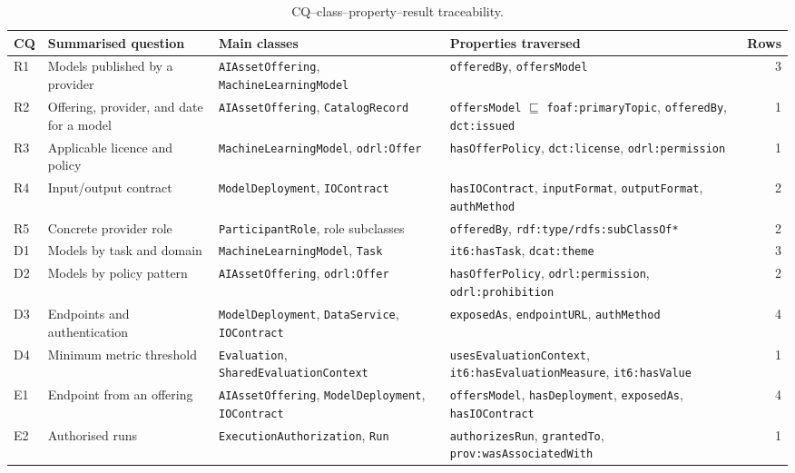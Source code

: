 \documentclass[Afour,sagev,times]{sagej}
\newcommand{\code}[1]{\texttt{#1}}
\begin{document}
\begin{table}[tb]
\scriptsize\sf\centering
\caption{CQ--class--property--result traceability.\label{tab:cq-trace}}
\begin{tabular}{@{}p{0.8cm}p{3.8cm}p{4.0cm}p{4.9cm}r@{}}
\toprule
\textbf{CQ} & \textbf{Summarised question} & \textbf{Main classes} & \textbf{Properties traversed} & \textbf{Rows} \\
\midrule
R1 & Models published by a provider & \code{AIAssetOffering}, \code{MachineLearningModel} & \code{offeredBy}, \code{offersModel} & 3 \\
R2 & Offering, provider, and date for a model & \code{AIAssetOffering}, \code{CatalogRecord} & \code{offersModel} $\sqsubseteq$ \code{foaf:primaryTopic}, \code{offeredBy}, \code{dct:issued} & 1 \\
R3 & Applicable licence and policy & \code{MachineLearningModel}, \code{odrl:Offer} & \code{hasOfferPolicy}, \code{dct:license}, \code{odrl:permission} & 1 \\
R4 & Input/output contract & \code{ModelDeployment}, \code{IOContract} & \code{hasIOContract}, \code{inputFormat}, \code{outputFormat}, \code{authMethod} & 2 \\
R5 & Concrete provider role & \code{ParticipantRole}, role subclasses & \code{offeredBy}, \code{rdf:type/}\newline\code{rdfs:subClassOf*} & 2 \\
D1 & Models by task and domain & \code{MachineLearningModel}, \code{Task} & \code{it6:hasTask}, \code{dcat:theme} & 3 \\
D2 & Models by policy pattern & \code{AIAssetOffering}, \code{odrl:Offer} & \code{hasOfferPolicy}, \code{odrl:permission}, \code{odrl:prohibition} & 2 \\
D3 & Endpoints and authentication & \code{ModelDeployment}, \code{DataService}, \code{IOContract} & \code{exposedAs}, \code{endpointURL}, \code{authMethod} & 4 \\
D4 & Minimum metric threshold & \code{Evaluation}, \code{SharedEvaluationContext} & \code{usesEvaluationContext}, \code{it6:hasEvaluationMeasure}, \code{it6:hasValue} & 1 \\
E1 & Endpoint from an offering & \code{AIAssetOffering}, \code{ModelDeployment}, \code{IOContract} & \code{offersModel}, \code{hasDeployment}, \code{exposedAs}, \code{hasIOContract} & 4 \\
E2 & Authorised runs & \code{ExecutionAuthorization}, \code{Run} & \code{authorizesRun}, \code{grantedTo}, \code{prov:wasAssociatedWith} & 1 \\

\end{tabular}
\end{table}
\end{document}
